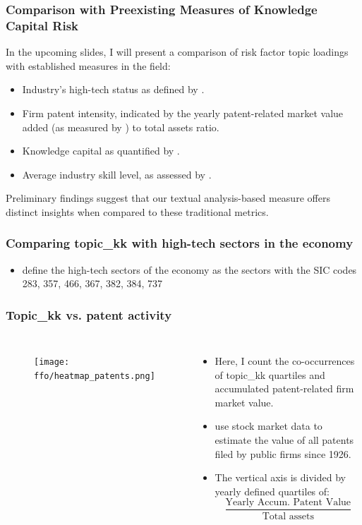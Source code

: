 \documentclass{beamer}
\newcommand{\ffo}{dicfullmc10thr10defnob40noa1_4t}
\begin{document}
\begin{frame}
  \frametitle{Comparison with Preexisting Measures of Knowledge Capital Risk}
  In the upcoming slides, I will present a comparison of risk factor topic loadings with established measures in the field:
  \begin{itemize}
    \item Industry's high-tech status as defined by \cite{Brown2009-zp}.
    \item Firm patent intensity, indicated by the yearly patent-related market value added (as measured by \cite{Kogan2017-fx}) to total assets ratio.
    \item Knowledge capital as quantified by \cite{Peters2017-fl}.
    \item Average industry skill level, as assessed by \cite{Belo2017-qi}. 
  \end{itemize}
  Preliminary findings suggest that our textual analysis-based measure offers distinct insights when compared to these traditional metrics.
\end{frame}

\begin{frame}
\label{defining_kk}
  \frametitle{Comparing topic\_kk with high-tech sectors in the economy}
  \begin{itemize}
  \item \cite{Brown2009-zp} define the high-tech sectors of the economy as the sectors with the SIC codes 283, 357, 466, 367, 382, 384, 737 
  
\end{itemize}
 \end{frame}

\begin{frame}
\frametitle{Topic\_kk vs. patent activity}
       \begin{columns}
             \begin{figure}[h!]
		  \centering
		  \texttt{[image: \\ffo/heatmap\_patents.png]}
		  \captionsetup{font=scriptsize}
		  \label{fig:firmsbypathm}
			\end{figure}
          \scriptsize
              \begin{itemize}
              \item Here, I count the co-occurrences of topic\_kk quartiles and accumulated patent-related firm market value.
              \item \cite{Kogan2017-fx} use stock market data to estimate the value of all patents filed by public firms since 1926.
			  \item The vertical axis is divided by yearly defined quartiles of:
			  \begin{equation}
  				\frac{\text{Yearly Accum. Patent Value}}{\text{Total assets}}
				\end{equation}
			\end{itemize}
	  \end{columns} 
\end{frame}
\end{document}
